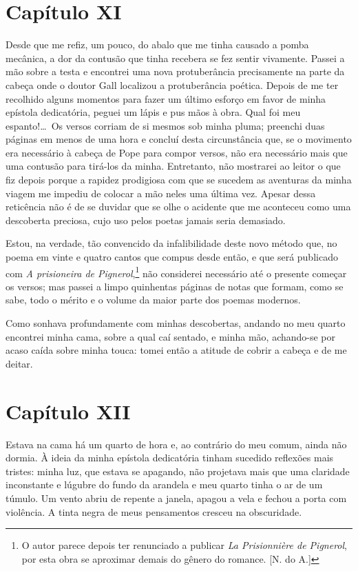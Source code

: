 \section*{Capítulo XI}

  Desde que me refiz, um pouco, do abalo que me tinha causado a pomba
mecânica, a dor da contusão que tinha recebera se fez sentir vivamente.
Passei a mão sobre a testa e encontrei uma nova protuberância
precisamente na parte da cabeça onde o doutor Gall localizou a
protuberância poética. Depois de me ter recolhido alguns momentos para
fazer um último esforço em favor de minha epístola dedicatória, peguei
um lápis e pus mãos à obra. Qual foi meu espanto!\ldots\ Os versos corriam
de si mesmos sob minha pluma; preenchi duas páginas em menos de uma
hora e concluí desta circunstância que, se o movimento era necessário à
cabeça de Pope para compor versos, não era necessário mais que uma
contusão para tirá-los da minha. Entretanto, não mostrarei ao leitor o
que fiz depois porque a rapidez prodigiosa com que se sucedem as
aventuras da minha viagem me impediu de colocar a mão neles uma última
vez. Apesar dessa reticência não é de se duvidar que se olhe o acidente
que me aconteceu como uma descoberta preciosa, cujo uso pelos poetas
jamais seria demasiado.

 Estou, na verdade, tão convencido da infalibilidade deste novo método
que, no poema em vinte e quatro cantos que compus desde então, e que
será publicado com \textit{A prisioneira de Pignerol},\footnote{ O autor
parece depois ter renunciado a publicar \textit{La Prisionnière de
Pignerol}, por esta obra se aproximar demais do gênero do romance.
[N. do A.]} não considerei necessário até o presente começar os versos; mas
passei a limpo quinhentas páginas de notas que formam, como se sabe,
todo o mérito e o volume da maior parte dos poemas modernos.

 Como sonhava profundamente com minhas descobertas, andando no meu
quarto encontrei minha cama, sobre a qual caí sentado, e minha mão,
achando-se por acaso caída sobre minha touca: tomei então a atitude de
cobrir a cabeça e de me deitar.

\section*{Capítulo XII}

 Estava na cama há um quarto de hora e, ao contrário do meu comum, ainda
não dormia. À ideia da minha epístola dedicatória tinham sucedido
reflexões mais tristes: minha luz, que estava se apagando, não
projetava mais que uma claridade inconstante e lúgubre do fundo da
arandela e meu quarto tinha o ar de um túmulo. Um vento abriu de
repente a janela, apagou a vela e fechou a porta com violência. A tinta
negra de meus pensamentos cresceu na obscuridade.

